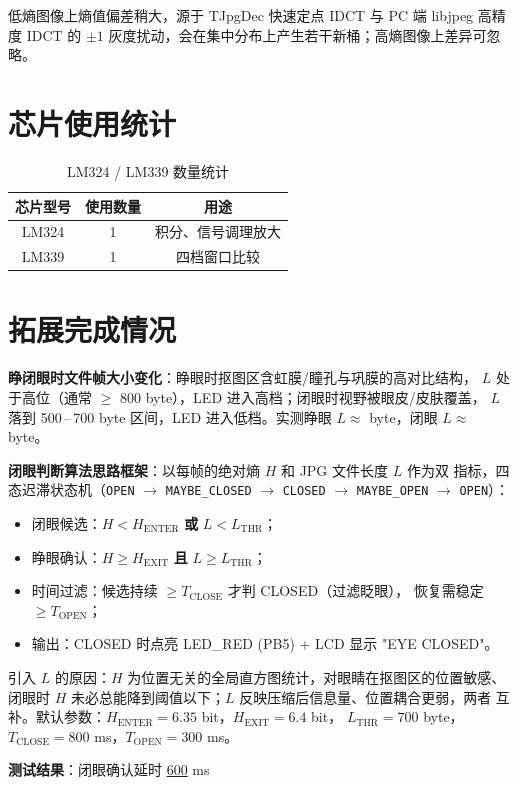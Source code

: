 \documentclass[a4paper]{article}
\begin{document}
低熵图像上熵值偏差稍大，源于 TJpgDec 快速定点 IDCT 与 PC 端 libjpeg 高精度
IDCT 的 $\pm 1$ 灰度扰动，会在集中分布上产生若干新桶；高熵图像上差异可忽略。

\section{芯片使用统计}

\begin{table}[H]
\centering
\footnotesize
\caption{LM324 / LM339 数量统计}
\begin{tabular}{ccc}
\toprule
芯片型号 & 使用数量 & 用途 \\
\midrule
LM324 & 1 & 积分、信号调理放大 \\
LM339 & 1 & 四档窗口比较 \\
\bottomrule
\end{tabular}
\end{table}

\section{拓展完成情况}

\textbf{睁闭眼时文件帧大小变化}：睁眼时抠图区含虹膜/瞳孔与巩膜的高对比结构，
$L$ 处于高位（通常 $\ge$ 800 byte），LED 进入高档；闭眼时视野被眼皮/皮肤覆盖，
$L$ 落到 500\,--\,700 byte 区间，LED 进入低档。实测睁眼 $L \approx$
\underline{\hspace{2.5em}} byte，闭眼 $L \approx$ \underline{\hspace{2.5em}} byte。

\textbf{闭眼判断算法思路框架}：以每帧的绝对熵 $H$ 和 JPG 文件长度 $L$ 作为双
指标，四态迟滞状态机（\texttt{OPEN} $\to$ \texttt{MAYBE\_CLOSED} $\to$
\texttt{CLOSED} $\to$ \texttt{MAYBE\_OPEN} $\to$ \texttt{OPEN}）：

\begin{itemize}
\item 闭眼候选：$H < H_{\mathrm{ENTER}}$ \textbf{或} $L < L_{\mathrm{THR}}$；
\item 睁眼确认：$H \ge H_{\mathrm{EXIT}}$ \textbf{且} $L \ge L_{\mathrm{THR}}$；
\item 时间过滤：候选持续 $\ge T_{\mathrm{CLOSE}}$ 才判 CLOSED（过滤眨眼），
恢复需稳定 $\ge T_{\mathrm{OPEN}}$；
\item 输出：CLOSED 时点亮 LED\_RED (PB5) + LCD 显示 "EYE CLOSED"。
\end{itemize}

引入 $L$ 的原因：$H$ 为位置无关的全局直方图统计，对眼睛在抠图区的位置敏感、
闭眼时 $H$ 未必总能降到阈值以下；$L$ 反映压缩后信息量、位置耦合更弱，两者
 互补。默认参数：$H_{\mathrm{ENTER}}=6.35$ bit，$H_{\mathrm{EXIT}}=6.4$ bit，
$L_{\mathrm{THR}}=700$ byte，$T_{\mathrm{CLOSE}}=800$ ms，$T_{\mathrm{OPEN}}=300$ ms。

\textbf{测试结果}：闭眼确认延时 \underline{600\hspace{2.5em}} ms
\end{document}
